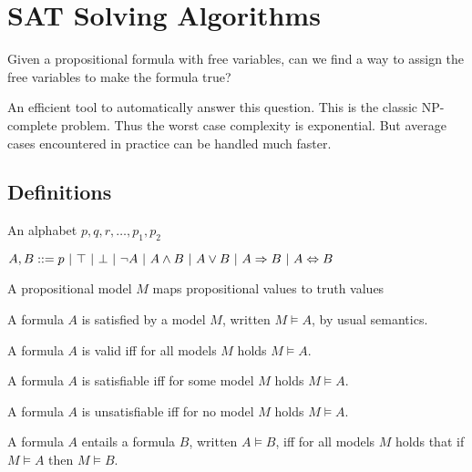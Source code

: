 \section{SAT Solving Algorithms}
\begin{mytitle} Given a propositional formula with free variables, can we find a way to assign the free variables to make the formula true?
\end{mytitle}
\begin{mytitle} An efficient tool to automatically answer this question. This is the classic NP-complete problem. Thus the worst case complexity is exponential. But average cases encountered in practice can be handled much faster.
\end{mytitle}
\subsection{Definitions}
\begin{mytitle} An alphabet $p, q, r, \ldots, p_1, p_2$
\end{mytitle}
\begin{mytitle} $A, B ::= p\ |\ \top\ |\ \bot\ |\ \lnot A\ |\ A \land B\ |\ A \lor B\ |\ A \To B\ |\ A \Leftrightarrow B$
\end{mytitle}
\begin{mytitle} A propositional model $M$ maps propositional values to truth values
\end{mytitle}
\begin{mytitle}[Satisfaction] A formula $A$ is satisfied by a model $M$, written $M \models A$, by usual semantics.
\end{mytitle}
\begin{mytitle}[Validity] A formula $A$ is valid iff for all models $M$ holds $M \models A$.
\end{mytitle}
\begin{mytitle}[Satisfiability] A formula $A$ is satisfiable iff for some model $M$ holds $M \models A$.
\end{mytitle}
\begin{mytitle}[Unsatisfiability] A formula $A$ is unsatisfiable iff for no model $M$ holds $M \models A$.
\end{mytitle}
\begin{mytitle}[Entailment] A formula $A$ entails a formula $B$, written $A \models B$, iff for all models $M$ holds that if $M \models A$ then $M \models B$.
\end{mytitle}
